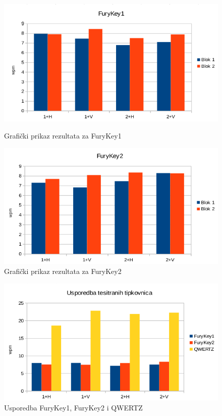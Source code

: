 \documentclass[times, utf8, zavrsni]{fer}
\begin{document}
\begin{figure}[htb]
  \centering
  \begin{minipage}[b]{0.48\textwidth}
    \includegraphics[width=\textwidth]{img/furykey1_sve_graf.png}
    \caption{Grafički prikaz rezultata za FuryKey1}
    \label{chart:furykey1_sve_graf}
  \end{minipage}
  \hfill
  \begin{minipage}[b]{0.48\textwidth}
    \includegraphics[width=\textwidth]{img/furykey2_sve_graf.png}
    \caption{Grafički prikaz rezultata za FuryKey2}
    \label{chart:furykey2_sve_graf}
  \end{minipage}
\end{figure}

\begin{figure}[htb]
\centering
\includegraphics[width=12cm]{img/usporedba.png}
\caption{Usporedba FuryKey1, FuryKey2 i QWERTZ}
\label{chart:usporedba}
\end{figure}
\end{document}
